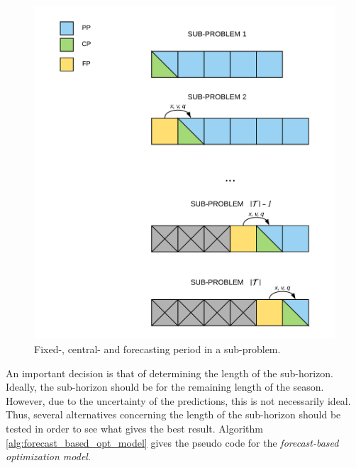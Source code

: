 \begin{figure}[H]
    \centering
    \includegraphics[scale = 0.47]{fig/chapter_5/rolling_horizon.png}
    \caption{Fixed-, central- and forecasting period in a sub-problem.}
    \label{fig:rolling_horizon}
\end{figure}

\newpar

An important decision is that of determining the length of the sub-horizon. Ideally, the sub-horizon should be for the remaining length of the season. However, due to the uncertainty of the predictions, this is not necessarily ideal. Thus, several alternatives concerning the length of the sub-horizon should be tested in order to see what gives the best result. Algorithm \ref{alg:forecast_based_opt_model} gives the pseudo code for the \textit{forecast-based optimization model}. 


\newpar

